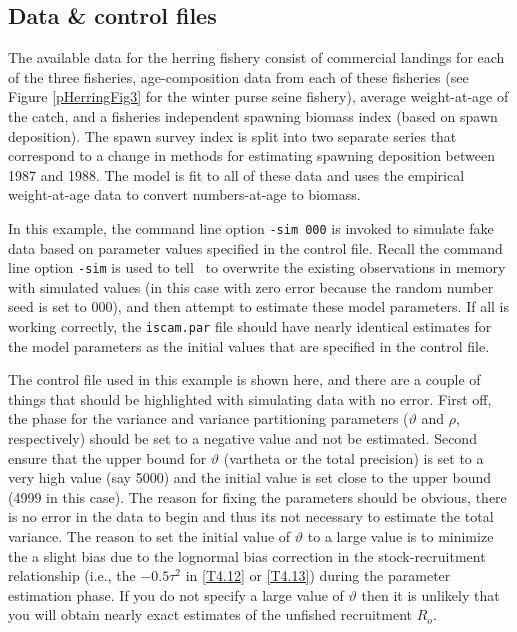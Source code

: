 \begin{multicols}{2}
\subsection{Data \& control files}
The available data for the herring fishery consist of commercial landings for each of the three fisheries, age-composition data from each of these fisheries (see Figure \ref{pHerringFig3} for the winter purse seine fishery), average weight-at-age of the catch, and a fisheries independent spawning biomass index (based on spawn deposition).  The spawn survey index is split into two separate series that correspond to a change in methods for estimating spawning deposition between 1987 and 1988.  The model is fit to all of these data and uses the empirical weight-at-age data to convert numbers-at-age to biomass.




In this example, the command line option \texttt{-sim 000} is invoked to simulate fake data based on parameter values specified in the control file.  Recall the command line option \texttt{-sim} is used to tell \iscam\ to overwrite the existing observations in memory with simulated values (in this case with zero error because the random number seed is set to 000), and then attempt to estimate these model parameters.  If all is working correctly, the \texttt{iscam.par} file should have nearly identical estimates for the model parameters as the initial values that are specified in the control file.

The control file used in this example is shown here, and there are a couple of things that should be highlighted with simulating data with no error.  First off, the phase for the variance and variance partitioning parameters ($\vartheta$ and $\rho$, respectively) should be set to a negative value and not be estimated.  Second ensure that the upper bound for $\vartheta$ (vartheta or the total precision) is set to a very high value (say 5000) and the initial value is set close to the upper bound (4999 in this case).  The reason for fixing the parameters should be obvious, there is no error in the data to begin and thus its not necessary to estimate the total variance.  The reason to set the initial value of $\vartheta$ to a large value is to minimize the a slight bias due to the lognormal bias correction in the stock-recruitment relationship (i.e., the $-0.5\tau^2$ in \ref{T4.12} or \ref{T4.13}) during the parameter estimation phase.  If you do not specify a large value of $\vartheta$ then it is unlikely that you will obtain nearly exact estimates of the unfished recruitment $R_o$.



\end{multicols}
